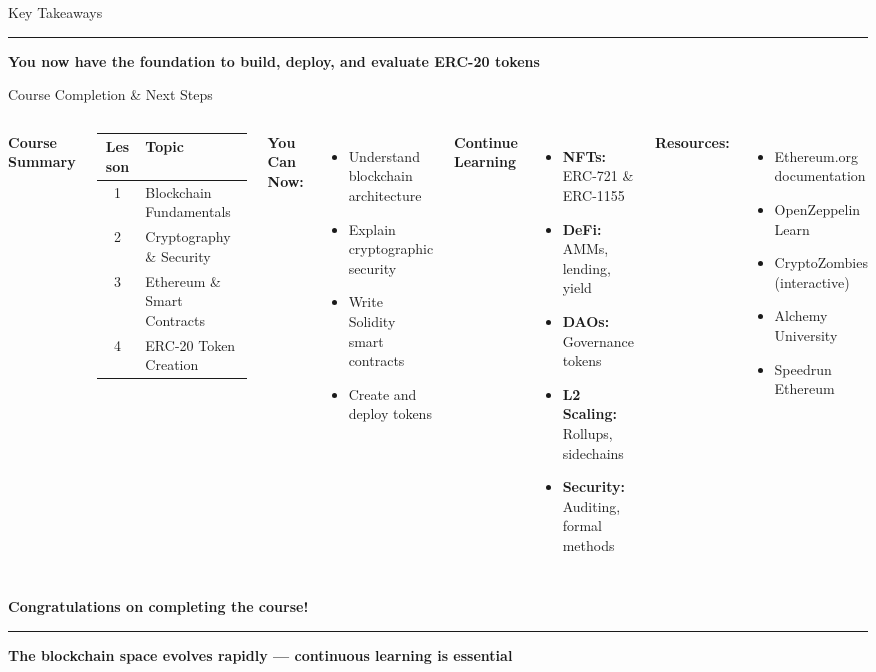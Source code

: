 \documentclass[8pt,aspectratio=169]{beamer}
\newcommand{\bottomnote}[1]{%
\vfill
\vspace{-2mm}
\textcolor{mllavender2}{\rule{\textwidth}{0.4pt}}
\vspace{1mm}
\footnotesize
\textbf{#1}
}
\begin{document}
\begin{frame}[t]{Key Takeaways}
\bottomnote{You now have the foundation to build, deploy, and evaluate ERC-20 tokens}
\end{frame}

\begin{frame}[t]{Course Completion \& Next Steps}
\begin{columns}[T]
\textbf{Course Summary}

\begin{tabular}{cl}
\toprule
\textbf{Lesson} & \textbf{Topic} \\
\midrule
1 & Blockchain Fundamentals \\
2 & Cryptography \& Security \\
3 & Ethereum \& Smart Contracts \\
4 & ERC-20 Token Creation \\
\bottomrule
\end{tabular}

\vspace{0.5em}
\textbf{You Can Now:}
\begin{itemize}
\item Understand blockchain architecture
\item Explain cryptographic security
\item Write Solidity smart contracts
\item Create and deploy tokens
\end{itemize}

\textbf{Continue Learning}

\begin{itemize}
\item \textbf{NFTs:} ERC-721 \& ERC-1155
\item \textbf{DeFi:} AMMs, lending, yield
\item \textbf{DAOs:} Governance tokens
\item \textbf{L2 Scaling:} Rollups, sidechains
\item \textbf{Security:} Auditing, formal methods
\end{itemize}

\vspace{0.5em}
\textbf{Resources:}
\begin{itemize}
\item Ethereum.org documentation
\item OpenZeppelin Learn
\item CryptoZombies (interactive)
\item Alchemy University
\item Speedrun Ethereum
\end{itemize}
\end{columns}

\vspace{0.5em}
\begin{center}
\textbf{Congratulations on completing the course!}
\end{center}

\bottomnote{The blockchain space evolves rapidly --- continuous learning is essential}
\end{frame}
\end{document}
